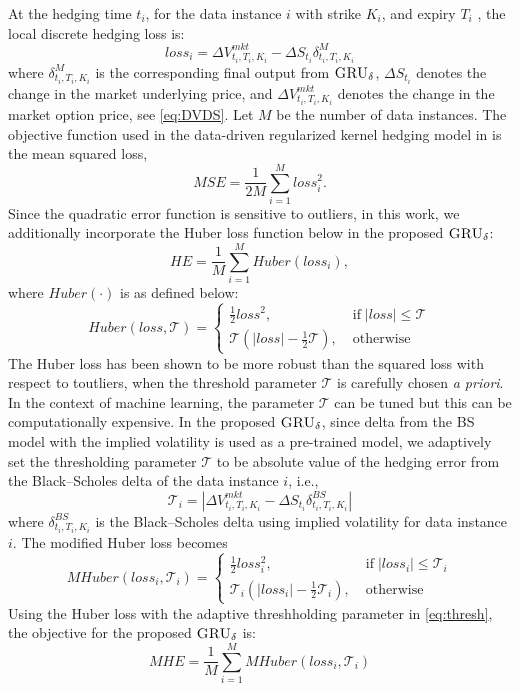 \documentclass[letterpaper,12pt,titlepage,oneside,final]{book}
\numberwithin{equation}{section}
\theoremstyle{definition}
\newcommand{\model}{\textsc{GRU}_\delta}
\newcommand{\DS}{\Delta S}
\begin{document}
At the hedging time $t_i$, for the data instance $i$ with  strike $K_i$, and expiry $T_i$ , the local discrete hedging loss is:
\[
loss_i=\Delta V^{mkt}_{t_i,T_i,K_i}-\DS_{t_i} \delta^M_{{t_i,T_i,K_i}}
\]
where  $\delta^M_{{t_i,T_i,K_i}}$ is the corresponding  final output from $\model$,  $\DS_{t_i}$ denotes the change in the market underlying price, and $\Delta V^{mkt}_{t_i,T_i,K_i}$ denotes the change in the market option price,  see \eqref{eq:DVDS}.
Let $M$ be the number of data instances.
The objective function used in the data-driven regularized kernel hedging model  in \citep{knian2017} is the mean squared loss,
\begin{equation}
MSE=\frac{1}{2M} \sum_{i=1}^{M} loss_i^2.
\label{l1}
\end{equation}
Since the quadratic error function is sensitive to outliers, in this work,
we additionally incorporate the Huber loss function  \citep{Huber1964robust}  below in the proposed $\model$:
\[
HE=\frac{1}{M} \sum_{i=1}^{M} Huber(loss_i),
\]
where $Huber(\cdot)$ is as defined below:
\[
Huber(loss,\mathcal{T})=\left\{ \begin{array}{ll }
\frac{1}{2} loss^2  , \;&  \text{if} \; |loss|\leq \mathcal{T}\\
\mathcal{T}(|loss|-\frac{1}{2}\mathcal{T}), \; &\text{otherwise}
\end{array} \right.
\]
The Huber loss \citep{Huber1964robust} has been shown to be more robust than the squared loss with respect to toutliers, when  the threshold parameter $\mathcal{T}$ is carefully chosen {\em a priori}.
In the context of machine learning, the parameter $\mathcal{T}$ can be tuned but this can be computationally expensive. In the proposed
$\model$, since delta from the BS model  with the implied volatility   is used as a pre-trained model, we adaptively set the thresholding parameter $\mathcal{T}$ to be absolute value of the hedging error from the Black–Scholes delta of the data instance $i$, i.e.,
\begin{equation}\label{eq:thresh}
\mathcal{T}_i=|\Delta V^{mkt}_{t_i,T_i,K_i}-\DS_{t_i} \delta^{BS}_{t_i,T_i,K_i}|
\end{equation}
where $\delta^{BS}_{t_i,T_i,K_i}$ is the Black–Scholes delta using implied volatility for data instance $i$.
The modified Huber loss  becomes
\[
MHuber(loss_i,\mathcal{T}_i)=\left\{ \begin{array}{ll}
\frac{1}{2} loss_i^2  , \; &\text{if} \; |loss_i|\leq \mathcal{T}_i\\
\mathcal{T}_i(|loss_i|-\frac{1}{2}\mathcal{T}_i), \; & \text{otherwise}
\end{array} \right.
\]
Using the Huber loss with the adaptive threshholding parameter in \eqref{eq:thresh}, the objective for the proposed $\model$  is:
\begin{equation}
MHE=\frac{1}{M} \sum_{i=1}^{M} MHuber(loss_i,\mathcal{T}_i)
\label{l2}
\end{equation}
\end{document}
